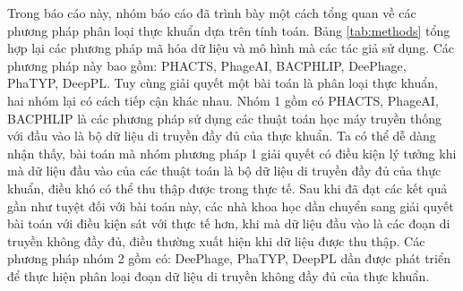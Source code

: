 \begin{table}[]
\centering
{}
\caption{Bảng tổng hợp phương pháp và mô hình các bài báo sử dụng}
\label{tab:methods}
\end{table}

Trong báo cáo này, nhóm báo cáo đã trình bày một cách tổng quan về các phương pháp phân loại thực khuẩn dựa trên tính toán. Bảng \ref{tab:methods} tổng hợp lại các phương pháp mã hóa dữ liệu và mô hình mà các tác giả sử dụng. Các phương pháp này bao gồm: PHACTS, PhageAI, BACPHLIP, DeePhage, PhaTYP, DeepPL. Tuy cùng giải quyết một bài toán là phân loại thực khuẩn, hai nhóm lại có cách tiếp cận khác nhau. Nhóm 1 gồm có PHACTS, PhageAI, BACPHLIP là các phương pháp sử dụng các thuật toán học máy truyền thống với đầu vào là bộ dữ liệu di truyền đầy đủ của thực khuẩn. Ta có thể dễ dàng nhận thấy, bài toán mà nhóm phương pháp 1 giải quyết có điều kiện lý tưởng khi mà dữ liệu đầu vào của các thuật toán là bộ dữ liệu di truyền đầy đủ của thực khuẩn, điều khó có thể thu thập được trong thực tế. Sau khi đã đạt các kết quả gần như tuyệt đối với bài toán này, các nhà khoa học dần chuyển sang giải quyết bài toán với điều kiện sát với thực tế hơn, khi mà dữ liệu đầu vào là các đoạn di truyền không đầy đủ, điều thường xuất hiện khi dữ liệu được thu thập. Các phương pháp nhóm 2 gồm có: DeePhage, PhaTYP, DeepPL dần được phát triển để thực hiện phân loại đoạn dữ liệu di truyền không đầy đủ của thực khuẩn.

